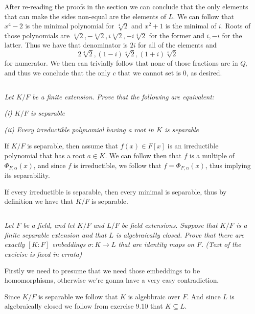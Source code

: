 \documentclass[11pt,oneside,titlepage]{book}
\begin{document}
After re-reading the proofs in the section we can conclude that the
only elements that can make the sides non-equal are the elements of
$L$. We can follow that $x^4 - 2$ is the minimal polynomial for
$\sqrt[4]{2}$ and $x^2 + 1$ is the minimal of $i$. Roots of those
polynomials are $\sqrt[4]{2}, -\sqrt[4]{2}, i\sqrt[4]{2},
-i\sqrt[4]{2}$ for the former and $i, -i$ for the latter. Thus we have
that denominator is $2i$ for all of the elements and
$$2\sqrt[4]{2}, (1 - i)\sqrt[4]{2}, (1 + i) \sqrt[4]{2}$$
for numerator. We then can trivially follow that none of those
fractions are in $Q$, and thus we conclude that the only $c$ that we
cannot set is $0$, as desired.

\subsection{}

\textit{Let $K/F$ be a finite extension. Prove that the following are equivalent:}

\textit{(i) $K/F$ is separable}

\textit{(ii) Every irreductible polynomial having a root in $K$ is separable}

If $K/F$ is separable, then assume that $f(x) \in F[x]$ is an
irreductible polynomial that has a root $a \in K$. We can follow then
that $f$ is a multiple of $\Phi_{F, \alpha}(x)$, and since $f$ is irreductible,
we follow that $f = \Phi_{F, \alpha}(x)$, thus implying its separability.

If every irreductible is separable, then every minimal is separable, thus by
definition we have that $K/F$ is separable.

\subsection{}

\textit{Let $F$ be a field, and let $K/F$ and $L/F$ be field
  extensions. Suppose that $K/F$ is a finite separable extension and
  that $L$ is algebraically closed. Prove that there are exactly $[K:F]$
  embeddings $\sigma: K \to L$ that are identity maps on $F$. (Text of
  the exeicise is fixed in errata)
}

Firstly we need to presume that we need those embeddings to be
homomorphisms, otherwise we're gonna have a very easy contradiction.

Since $K/F$ is separable we follow that $K$ is algebbraic over
$F$. And since $L$ is algebraically closed we follow from exercise
9.10 that $K \subseteq L$.
\end{document}
